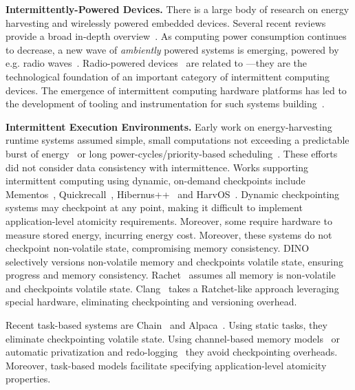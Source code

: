 \textbf{Intermittently-Powered Devices.} There is a large body of research on energy harvesting and wirelessly powered embedded devices. Several recent reviews provide a broad in-depth overview~\cite{prasad_comst_2014,sample_procieee_2013,huang:commag:2015,visser_procieee_2013,kamalinejad_commag_2015,ku_cst_2016}. As computing power consumption continues to decrease, a new wave of {\em ambiently} powered systems is emerging, powered by e.g. radio waves~\cite{patel_pervasive_2017,rf_powered_computing_gollakota_2014}.
Radio-powered devices~\cite{wisp5,moo,zhao_rfid_2015,holleman_biocas_2008,thomas_jbcs_2012,naderiparizi_rfid_2015,rodriguez_tbcs_2015,liu_sigcomm_2013,kicksat,nadeau_naturebio_2017}
are related to \sys---they are the technological foundation of an
important category of intermittent computing devices. The emergence of
intermittent computing hardware platforms has led to the development of tooling
and instrumentation for such systems building~\cite{hester_sensys_2014,hester_sensys_2015,edb,stork,wisent}.

\textbf{Intermittent Execution Environments.} Early work on energy-harvesting runtime systems assumed simple, small computations not exceeding a predictable burst of energy~\cite{dewdrop} or long power-cycles/priority-based scheduling~\cite{sorber_sensys_2007}. These efforts did not consider data consistency with intermittence. Works supporting intermittent computing using dynamic, on-demand checkpoints include Mementos~\cite{mementos}, Quickrecall~\cite{quickrecall}, Hibernus++~\cite{hibernusplusplus} and HarvOS~\cite{mottola2017harvos}. Dynamic checkpointing systems may checkpoint
at any point, making it difficult to implement application-level atomicity
requirements. Moreover, some require hardware to measure stored energy, incurring energy cost. Moreover, these systems do not checkpoint non-volatile state, compromising memory consistency. DINO~\cite{dino} selectively versions non-volatile memory and checkpoints volatile state, ensuring progress and memory consistency. Rachet~\cite{ratchet} assumes all memory is non-volatile and checkpoints volatile state. Clang~\cite{hicks_isca_2017} takes a Ratchet-like approach leveraging special hardware, eliminating checkpointing and versioning overhead. 

Recent task-based systems are Chain~\cite{chain} and Alpaca~\cite{alpaca}. Using static tasks, they eliminate checkpointing volatile state. Using channel-based memory models~\cite{chain} or automatic privatization and redo-logging~\cite{alpaca} they avoid checkpointing overheads. Moreover, task-based models facilitate specifying application-level atomicity properties.

